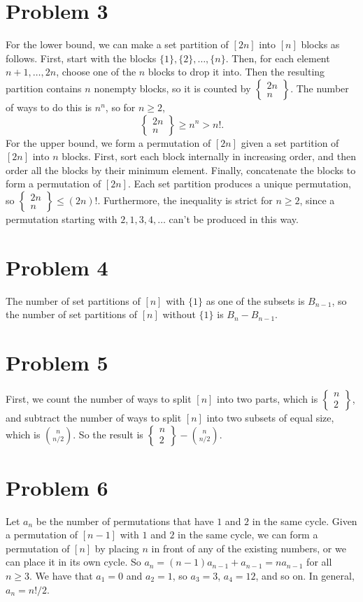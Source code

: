 \documentclass{article}
\newcommand{\sstirling}[2]
    {\left\{
    \begin{matrix}
        #1 \\
        #2
    \end{matrix}
    \right\}}
\begin{document}
\section*{Problem 3}
For the lower bound, we can make a set partition of $[2n]$ into $[n]$ blocks as follows. First, start with the blocks $\{1\}, \{2\}, \ldots, \{n\}$. Then, for each element $n + 1, \ldots, 2n$, choose one of the $n$ blocks to drop it into. Then the resulting partition contains $n$ nonempty blocks, so it is counted by $\sstirling{2n}{n}$. The number of ways to do this is $n^n$, so for $n \ge 2$,
$$\sstirling{2n}{n} \ge n^n > n!.$$
For the upper bound, we form a permutation of $[2n]$ given a set partition of $[2n]$ into $n$ blocks. First, sort each block internally in increasing order, and then order all the blocks by their minimum element. Finally, concatenate the blocks to form a permutation of $[2n]$. Each set partition produces a unique permutation, so $\sstirling{2n}{n} \le (2n)!$. Furthermore, the inequality is strict for $n \ge 2$, since a permutation starting with $2, 1, 3, 4, \ldots$ can't be produced in this way.

\section*{Problem 4}
The number of set partitions of $[n]$ with $\{1\}$ as one of the subsets is $B_{n - 1}$, so the number of set partitions of $[n]$ without $\{1\}$ is $B_n - B_{n - 1}$.

\section*{Problem 5}
First, we count the number of ways to split $[n]$ into two parts, which is $\sstirling n2$, and subtract the number of ways to split $[n]$ into two subsets of equal size, which is $\binom{n}{n/2}$. So the result is $\sstirling n2 - \binom{n}{n/2}$.

\section*{Problem 6}
Let $a_n$ be the number of permutations that have $1$ and $2$ in the same cycle. Given a permutation of $[n - 1]$ with $1$ and $2$ in the same cycle, we can form a permutation of $[n]$ by placing $n$ in front of any of the existing numbers, or we can place it in its own cycle. So $a_n = (n - 1)a_{n - 1} + a_{n - 1} = na_{n - 1}$ for all $n \ge 3$. We have that $a_1 = 0$ and $a_2 = 1$, so $a_3 = 3$, $a_4 = 12$, and so on. In general, $a_n = n!/2$. \\
\end{document}
